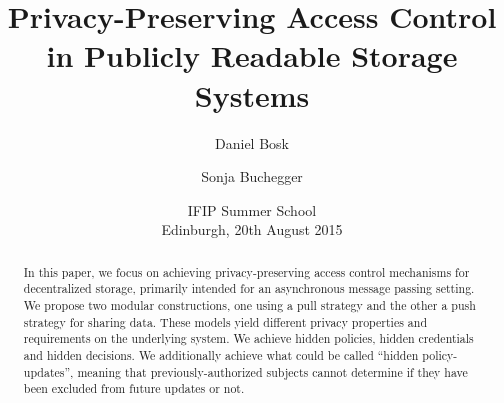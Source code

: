 \title{%
  Privacy-Preserving Access Control
  in Publicly Readable Storage Systems
}
\author{%
  Daniel Bosk \and
  Sonja Buchegger
}
\date{IFIP Summer School\\Edinburgh, 20th August 2015}

\maketitle

\mode* %

\begin{abstract}
  In this paper, we focus on achieving privacy-preserving access control 
  mechanisms for decentralized storage, primarily intended for an asynchronous 
  message passing setting.
  We propose two modular constructions, one using a pull strategy and the other
  a push strategy for sharing data.
  These models yield different privacy properties and requirements on the 
  underlying system.
  We achieve hidden policies, hidden credentials and hidden decisions.
  We additionally achieve what could be called \enquote{hidden policy-updates}, 
  meaning that previously-authorized subjects cannot determine if they have 
  been excluded from future updates or not.

\end{abstract}


%


